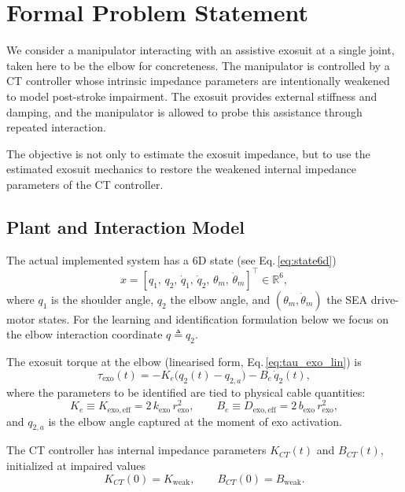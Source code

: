 \documentclass[11pt]{article}
\begin{document}
\section{Formal Problem Statement}

We consider a manipulator interacting with an assistive exosuit at a single joint, taken here to be the elbow for concreteness. The manipulator is controlled by a CT controller whose intrinsic impedance parameters are intentionally weakened to model post-stroke impairment. The exosuit provides external stiffness and damping, and the manipulator is allowed to probe this assistance through repeated interaction.

The objective is not only to estimate the exosuit impedance, but to use the estimated exosuit mechanics to restore the weakened internal impedance parameters of the CT controller.

\subsection{Plant and Interaction Model}

The actual implemented system has a 6D state (see Eq.\,\eqref{eq:state6d})
\begin{equation}
    x = [q_1,\, q_2,\, \dot{q}_1,\, \dot{q}_2,\, \theta_m,\, \dot{\theta}_m]^\top \in \mathbb{R}^6,
\end{equation}
where $q_1$ is the shoulder angle, $q_2$ the elbow angle, and $(\theta_m,\dot{\theta}_m)$ the SEA drive-motor states.  For the learning and identification formulation below we focus on the elbow interaction coordinate $q \triangleq q_2$.

The exosuit torque at the elbow (linearised form, Eq.\,\eqref{eq:tau_exo_lin}) is
\begin{equation}
    \tau_{\mathrm{exo}}(t) = -K_e\bigl(q_2(t)-q_{2,a}\bigr) - B_e\,\dot{q}_2(t),
    \label{eq:exo_torque}
\end{equation}
where the parameters to be identified are tied to physical cable quantities:
\begin{equation}
    K_e \equiv K_{\mathrm{exo,eff}} = 2\,k_{\mathrm{exo}}\,r_{\mathrm{exo}}^2,\qquad
    B_e \equiv D_{\mathrm{exo,eff}} = 2\,b_{\mathrm{exo}}\,r_{\mathrm{exo}}^2,
    \label{eq:Ke_Be_def}
\end{equation}
and $q_{2,a}$ is the elbow angle captured at the moment of exo activation.

The CT controller has internal impedance parameters $K_{CT}(t)$ and $B_{CT}(t)$, initialized at impaired values
\begin{equation}
    K_{CT}(0)=K_{\mathrm{weak}}, \qquad B_{CT}(0)=B_{\mathrm{weak}}.
    \label{eq:weak_init}
\end{equation}
\end{document}
